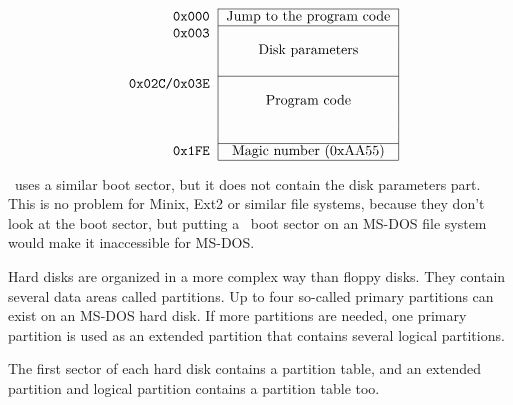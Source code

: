 $$
\begin{tabular}{r|c|}
  \cline{2-2}
  \tt 0x000 & Jump to the program code\\
  \cline{2-2}
  \tt 0x003 & \\
  & Disk parameters \\
  & \\
  \cline{2-2}
  \tt 0x02C/0x03E & \\
  & Program code \\
  & \\
  & \\
  \cline{2-2}
  \tt 0x1FE & Magic number (0xAA55)\\
  \cline{2-2}
\end{tabular}
$$

\LILO\ uses a similar boot sector, but it does not contain the disk
parameters part. This is no problem for Minix, Ext2 or similar file systems,
because
they don't look at the boot sector, but putting a \LILO\ boot sector on an
MS-DOS file system would make it inaccessible for MS-DOS.

Hard disks are organized in a more complex way than floppy disks. They
contain several data areas called partitions. Up to four so-called
primary partitions can exist on an MS-DOS hard disk. If more partitions
are needed, one primary partition is used as an extended partition that
contains several logical partitions.

The first sector of each hard disk contains a partition table, and an
extended partition and  logical partition contains a partition
table too.

